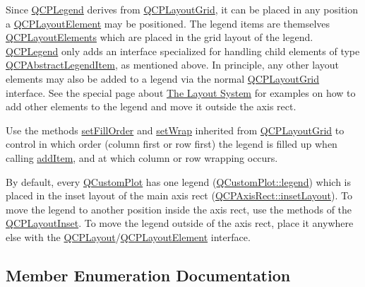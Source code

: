 Since \hyperlink{class_q_c_p_legend}{Q\+C\+P\+Legend} derives from \hyperlink{class_q_c_p_layout_grid}{Q\+C\+P\+Layout\+Grid}, it can be placed in any position a \hyperlink{class_q_c_p_layout_element}{Q\+C\+P\+Layout\+Element} may be positioned. The legend items are themselves \hyperlink{class_q_c_p_layout_element}{Q\+C\+P\+Layout\+Elements} which are placed in the grid layout of the legend. \hyperlink{class_q_c_p_legend}{Q\+C\+P\+Legend} only adds an interface specialized for handling child elements of type \hyperlink{class_q_c_p_abstract_legend_item}{Q\+C\+P\+Abstract\+Legend\+Item}, as mentioned above. In principle, any other layout elements may also be added to a legend via the normal \hyperlink{class_q_c_p_layout_grid}{Q\+C\+P\+Layout\+Grid} interface. See the special page about \hyperlink{}{The Layout System} for examples on how to add other elements to the legend and move it outside the axis rect.

Use the methods \hyperlink{class_q_c_p_layout_grid_affc2f3cfd22f28698c5b29b960d2a391}{set\+Fill\+Order} and \hyperlink{class_q_c_p_layout_grid_ab36af18d77e4428386d02970382ee598}{set\+Wrap} inherited from \hyperlink{class_q_c_p_layout_grid}{Q\+C\+P\+Layout\+Grid} to control in which order (column first or row first) the legend is filled up when calling \hyperlink{class_q_c_p_legend_a3ab274de52d2951faea45a6d975e6b3f}{add\+Item}, and at which column or row wrapping occurs.

By default, every \hyperlink{class_q_custom_plot}{Q\+Custom\+Plot} has one legend (\hyperlink{class_q_custom_plot_a4eadcd237dc6a09938b68b16877fa6af}{Q\+Custom\+Plot\+::legend}) which is placed in the inset layout of the main axis rect (\hyperlink{class_q_c_p_axis_rect_a949f803466619924c7018df4b511ae10}{Q\+C\+P\+Axis\+Rect\+::inset\+Layout}). To move the legend to another position inside the axis rect, use the methods of the \hyperlink{class_q_c_p_layout_inset}{Q\+C\+P\+Layout\+Inset}. To move the legend outside of the axis rect, place it anywhere else with the \hyperlink{class_q_c_p_layout}{Q\+C\+P\+Layout}/\hyperlink{class_q_c_p_layout_element}{Q\+C\+P\+Layout\+Element} interface. 

\subsection{Member Enumeration Documentation}
\mbox{\label{class_q_c_p_legend_a5404de8bc1e4a994ca4ae69e2c7072f1}} 
